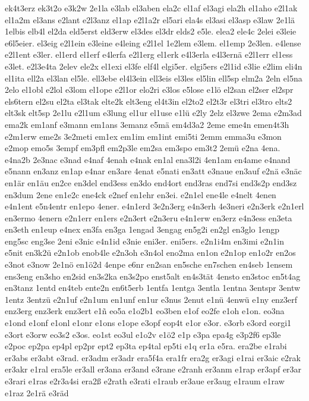 {ek4t3erz
ek3t2o
e3k2w
2e1la
e3lab
el3aben
ela2c
el1af
el3agi
ela2h
el1aho
e2l1ak
el1a2m
el3ans
e2lant
e2l3anz
el1ap
e2l1a2r
el5ari
ela4s
el3asi
el3asp
e3law
2e1lä
1elbis
elb4l
el2da
eld5erst
eld3erw
el3des
el3dr
elds2
e5le.
elea2
ele4c
2elei
e3leie
e6l5eier.
el3eig
e2l1ein
e3leine
e4leing
e2l1el
1e2lem
e3lem.
el1emp
2e3len.
e4lense
e2l1ent
e3ler.
el1erd
el1erf
e4lerfa
e2l1erg
el1erk
e4l3erla
e4l3ernä
e2l1err
el1ess
e3let.
e2l3e4ta
2elev
ele2x
el1exi
el3fe
elf4l
elgi5er.
elgi5ers
e2l1id
e3lie
e2lim
eli4n
el1ita
ell2a
el3lan
el5le.
ell3ebe
el4l3ein
ell3eis
el3les
el5lin
ell5sp
elm2a
2eln
el5na
2elo
el1obl
e2lol
e3lom
el1ope
e2l1or
elo2ri
e3los
e5lose
e1lö
el2san
el2ser
el2spr
els6tern
el2su
el2ta
el3tak
elte2k
elt3eng
el4t3in
el2to2
el2t3r
el3tri
el3tro
elts2
elt3sk
elt5sp
2e1lu
e2l1um
e3lung
el1ur
el1use
e1lü
e2ly
2elz
el3zwe
2ema
e2m3ad
ema2k
em1anf
e3mann
em1ans
3emanz
e5mä
em4d3a2
2eme
eme4n
emen4t3h
e2m1erw
eme2s
3e2meti
em1ex
em1im
em1int
emi5ti
2emm
emma3u
e3mon
e2mop
emo5s
3empf
em3pfl
em2p3le
em2sa
em3spo
em3t2
2emü
e2na
4ena.
e4na2b
2e3nac
e3nad
e4naf
4enah
e4nak
en1al
ena3l2i
4en1am
en4ame
e4nand
e5nann
en3anz
en1ap
e4nar
en3are
4enat
e5nati
en3att
e3naue
en3auf
e2nä
e3näc
en1är
en1äu
en2ce
en3del
end3ess
en3do
end4ort
end3ras
end7si
end3s2p
end3sz
en3dum
2ene
en1e2c
ene4ck
e2nef
en1ehr
en3ei.
e2n1el
ene4le
e4nelt
4enen
e4n1ent
e5n4entr
en1epo
4ener.
e4n1erd
3e2n3erg
e4n3erh
4e3neri
e2n3erk
e2n1erl
en3ermo
4enern
e2n1err
en1ers
e2n3ert
e2n3eru
e4n1erw
en3erz
e4n3ess
en3eta
en3eth
en1eup
e4nex
en3fa
en3ga
1engad
3engag
en5g2i
en2gl
en3glo
1engp
eng5sc
eng3se
2eni
e3nic
e4n1id
e3nie
eni3er.
eni5ers.
e2n1i4m
en3imi
e2n1in
e5nit
en3k2ü
e2n1ob
enob4le
e2n3oh
e3n4ol
eno2ma
en1on
e2n1op
en1o2r
en2os
e3not
e3now
2e1nö
en1ö2d
4enpe
e6nr
en2san
en5sche
en7schen
en4seb
1ensem
ens3eng
en3sho
en2sid
en3s2ka
en3s2po
enst5alt
en4s3tät
4ensto
en3stoc
en5t4ag
en3tanz
1entd
en4teb
ente2n
en6t5erb
1entfa
1entga
3entla
1entna
3entspr
3entw
1entz
3entzü
e2n1uf
e2n1um
en1unf
en1ur
e3nus
2enut
e1nü
4enwü
e1ny
enz3erf
enz3erg
enz3erk
enz3ert
e1ñ
eo5a
e1o2b1
eo3ben
e1of
eo2fe
e1oh
e1on.
eo3na
e1ond
e1onf
e1onl
e1onr
e1ons
e1ope
e3opf
eop4t
e1or
e3or.
e3orb
e3ord
eorgi1
e3ort
e3orw
eo3s2
e3os.
eo1st
eo3ul
e1o2v
e1ö2
e1p
e3pa
epa4g
e3p2f6
ep3le
e2poc
ep2pa
ep4pl
ep2pr
ept2
ep3ta
ep4tal
ep5ti
e1q
er1a
e5ra.
era2be
e1rabi
er3abs
er3abt
e3rad.
er3adm
er3adr
era5f4a
era1fr
era2g
er3agi
e1rai
er3aic
e2rak
er3akr
e1ral
era5le
er3all
er3ana
er3and
e3rane
e2ranh
er3anm
e1rap
er3apf
er3ar
e3rari
e1ras
e2r3a4si
era2ß
e2rath
e3rati
e1raub
er3aue
er3aug
e1raum
e1raw
e1raz
2e1rä
e3räd
}
